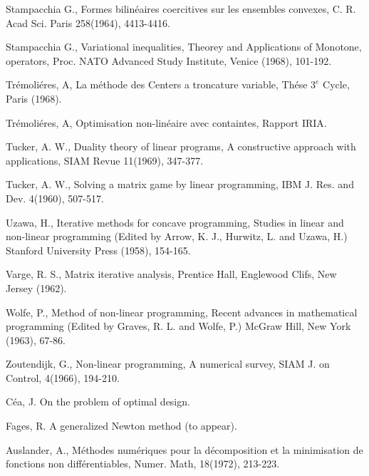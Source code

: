 \begin{thebibliography}{99}
 {Stampacchia G.}, Formes bilin\'{e}aires coercitives
  sur les ensembles convexes, C. R. Acad Sci. Paris 258(1964),
  4413-4416.  

 {Stampacchia G.}, Variational inequalities, Theorey
  and Applications of Monotone, operators, Proc. NATO Advanced Study
  Institute, Venice (1968), 101-192.  

 {Tr\'{e}moli\'{e}res, A}, La m\'{e}thode des Centers a
  troncature variable, Th\'{e}se $3^{e}$ Cycle, Paris (1968).   

 {Tr\'{e}moli\'{e}res, A}, Optimisation
  non-lin\'{e}aire avec containtes, Rapport IRIA.  

 {Tucker, A. W.}, Duality theory of linear programs, A
  constructive approach with applications, SIAM Revue 11(1969),
  347-377.  

 {Tucker, A. W.}, Solving a matrix game by linear
  programming, IBM J. Res. and Dev. 4(1960), 507-517.  

 {Uzawa, H.}, Iterative methods for concave
  programming, Studies in linear and non-linear programming (Edited by
  Arrow, K. J., Hurwitz, L. and Uzawa, H.) Stanford University Press
  (1958), 154-165.  

 {Varge, R. S.}, Matrix iterative analysis, Prentice
  Hall, Englewood Clifs, New Jersey (1962).  

 {Wolfe, P.}, Method of non-linear programming, Recent
  advances in mathematical programming (Edited by Graves, R. L. and
  Wolfe, P.) McGraw Hill, New York (1963), 67-86. 

 {Zoutendijk, G.}, Non-linear programming, A numerical
  survey, SIAM J. on Control, 4(1966), 194-210.   

 {C\'{e}a, J.} On the problem of optimal design.

 {Fages, R.} A generalized Newton method (to appear).

 {Auslander, A.}, M\'{e}thodes num\'{e}riques pour la
  d\'{e}composition et la minimisation de fonctions non
  diff\'{e}rentiables, Numer. Math, 18(1972), 213-223.
\end{thebibliography}



